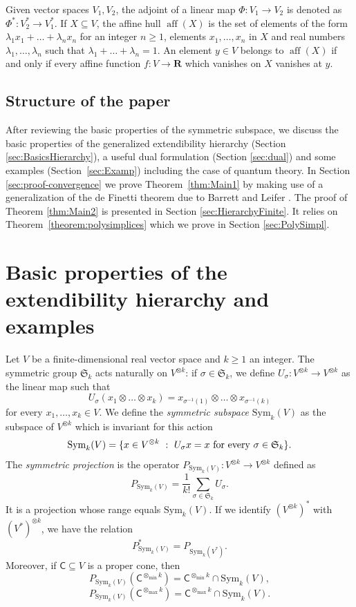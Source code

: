 \documentclass{amsart}
\newcommand{\st}{\ : \ }
\renewcommand{\geq}{\geqslant}
\renewcommand{\subset}{\subseteq}
\newcommand{\gC}{\mathsf{C}}
\newcommand{\R}{\mathbf{R}}
\DeclareMathOperator{\aff}{\mathrm{aff}}
\newcommand{\Sym}{\mathrm{Sym}}
\theoremstyle{plain}
\newcommand{\tmin}{{\otimes_{\min}}}
\newcommand{\tmax}{{\otimes_{\max}}}
\begin{document}
Given vector spaces $V_1,V_2$, the adjoint of a linear map $\Phi:V_1 \to V_2$ is denoted as $\Phi^* : V_2^* \to V_1^*$. If $X \subset V$, the affine hull $\aff(X)$ is the set of elements of the form $\lambda_1 x_1 + \dots + \lambda_n x_n$ for an integer $n \geq 1$, elements $x_1,\dots,x_n$ in $X$ and real numbers $\lambda_1,\dots,\lambda_n$ such that $\lambda_1 + \dots +\lambda_n =1$. An element $y \in V$ belongs to $\aff(X)$ if and only if every affine function $f:V \to \R$ which vanishes on $X$ vanishes at $y$.

\subsection*{Structure of the paper} After reviewing the basic properties of the symmetric subspace, we discuss the basic properties of the generalized extendibility hierarchy (Section \ref{sec:BasicsHierarchy}), a useful dual formulation (Section \ref{sec:dual}) and some examples (Section~\ref{sec:Examp}) including the case of quantum theory. In Section \ref{sec:proof-convergence} we prove Theorem~\ref{thm:Main1} by making use of a generalization of the de Finetti theorem due to Barrett and Leifer \cite{BarrettLeifer}. The proof of Theorem \ref{thm:Main2} is presented in Section \ref{sec:HierarchyFinite}. It relies on Theorem~\ref{theorem:polysimplices} which we prove in Section \ref{sec:PolySimpl}.

\section{Basic properties of the extendibility hierarchy and examples} \label{sec:results}
Let $V$ be a finite-dimensional real vector space and $k \geq 1$ an integer. The symmetric group $\mathfrak{S}_k$ acts naturally on $V^{\otimes k}$: if $\sigma \in \mathfrak{S}_k$, we define $U_\sigma : V^{\otimes k} \to V^{\otimes k}$ as the linear map such that
\[ U_\sigma (x_1 \otimes \dots \otimes x_k) = x_{\sigma^{-1}(1)} \otimes \dots \otimes x_{\sigma^{-1}(k)}\]
for every $x_1,\dots,x_k \in V$.
We define the \emph{symmetric subspace} $\Sym_k(V)$ as the subspace of $V^{\otimes k}$ which is invariant for this action
\[ \Sym_k(V) = \{ x \in V^{\otimes k} \st U_\sigma x = x \textnormal{ for every } \sigma \in \mathfrak{S}_k \}. \]
The \emph{symmetric projection} is the operator $P_{\Sym_k(V)} : V^{\otimes k} \to V^{\otimes k}$ defined as
\[ P_{\Sym_k(V)} = \frac{1}{k!} \sum_{\sigma \in \mathfrak{S}_k} U_\sigma .\]
It is a projection whose range equals $\Sym_k(V)$. If we identify $(V^{\otimes k})^*$ with $(V^*)^{\otimes k}$, we have the relation
\[ P_{\Sym_k(V)}^* = P_{\Sym_k(V^*)} .\]
Moreover, if $\gC \subset V$ is a proper cone, then
\[ P_{\Sym_k(V)}( \gC ^{\tmin k}) = \gC ^{\tmin k} \cap {\Sym_k(V)}, \]
\[ P_{\Sym_k(V)}( \gC ^{\tmax k}) = \gC ^{\tmax k} \cap {\Sym_k(V)}. \]
\end{document}
